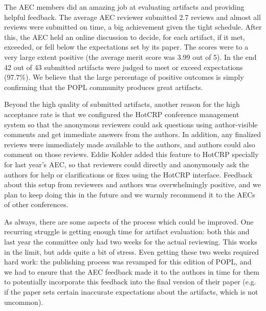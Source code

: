 
%
The AEC members did an amazing job at evaluating artifacts and
providing helpful feedback.
%
The average AEC reviewer submitted 2.7 reviews and almost all reviews
 were submitted on time, a big achievement given the tight schedule.
%
After this, the AEC held an online discussion to decide, for each
artifact, if it met, exceeded, or fell below the expectations set by
its paper.
%
The scores were to a very large extent positive (the average merit
score was 3.99 out of 5).
%
In the end 42 out of 43 submitted artifacts were judged to meet or
exceed expectations (97.7\%).
%
We believe that the large percentage of positive outcomes is simply
confirming that the POPL community produces great artifacts.

Beyond the high quality of submitted artifacts, another reason for the
high acceptance rate is that we configured the HotCRP conference
management system so that the anonymous reviewers could ask questions
using author-visible comments and get immediate answers from the
authors. In addition, any finalized reviews were immediately made
available to the authors, and authors could also comment on those
reviews. Eddie Kohler added this feature to HotCRP specially for last
year's AEC, so that reviewers could directly and anonymously ask the
authors for help or clarifications or fixes using the HotCRP
interface. Feedback about this setup from reviewers and authors was
overwhelmingly positive, and we plan to keep doing this in the future
and we warmly recommend it to the AECs of other conferences.

As always, there are some aspects of the process which could be
improved. One recurring struggle is getting enough time for artifact
evaluation: both this and last year the committee only had two weeks
for the actual reviewing. This works in the limit, but adds quite a
bit of stress. Even getting these two weeks required hard work: the
publishing process was revamped for this edition of POPL, and we had
to ensure that the AEC feedback made it to the authors in time for
them to potentially incorporate this feedback into the final version of their
paper (e.g. if the paper sets certain inaccurate expectations about
the artifacts, which is not uncommon).


